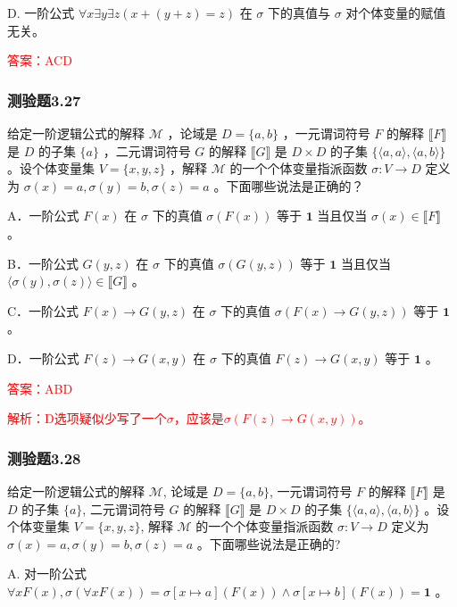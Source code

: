 \documentclass[UTF8, heading=true]{ctexart}
\begin{document}
D. 一阶公式 $\forall x \exists y \exists z(x+(y+z)=z)$ 在 $\sigma$ 下的真值与 $\sigma$ 对个体变量的赋值无关。

\textcolor{red}{答案：ACD}

\subsubsection{测验题3.27}

给定一阶逻辑公式的解释 $\mathcal{M}$ ，论域是 $D=\{a, b\}$ ，一元谓词符号 $F$ 的解释 $\llbracket F\rrbracket$ 是 $D$ 的子集 $\{a\}$ ，二元谓词符号 $G$ 的解释 $\llbracket G \rrbracket$ 是 $D \times D$ 的子集 $\{\langle a, a\rangle,\langle a, b\rangle\}$ 。设个体变量集 $V=\{x, y, z\}$ ，解释 $\mathcal{M}$ 的一个个体变量指派函数 $\sigma: V \rightarrow D$ 定义为 $\sigma(x)=a, \sigma(y)=b, \sigma(z)=a$ 。下面哪些说法是正确的？

A．一阶公式 $F(x)$ 在 $\sigma$ 下的真值 $\sigma(F(x))$ 等于 $\mathbf{1}$ 当且仅当 $\sigma(x) \in \llbracket F \rrbracket$ 。

B．一阶公式 $G(y, z)$ 在 $\sigma$ 下的真值 $\sigma(G(y, z))$ 等于 $\mathbf{1}$ 当且仅当 $\langle\sigma(y), \sigma(z)\rangle \in \llbracket G \rrbracket$ 。

C．一阶公式 $F(x) \rightarrow G(y, z)$ 在 $\sigma$ 下的真值 $\sigma(F(x) \rightarrow G(y, z))$ 等于 $\mathbf{1}$ 。

D．一阶公式 $F(z) \rightarrow G(x, y)$ 在 $\sigma$ 下的真值 $F(z) \rightarrow G(x, y)$ 等于 $\mathbf{1}$ 。


\textcolor{red}{答案：ABD}

\textcolor{red}{解析：D选项疑似少写了一个$\sigma$，应该是$\sigma(F(z) \rightarrow G(x, y))$。}

\subsubsection{测验题3.28}

给定一阶逻辑公式的解释 $\mathcal{M}$, 
论域是 $D=\{a, b\}$, 一元谓词符号 $F$ 的解释 $\llbracket F \rrbracket$ 
是 $D$ 的子集 $\{a\}$, 二元谓词符号 $G$ 的解释 $\llbracket G \rrbracket$ 是 $D \times D$ 的子集 $\{\langle a, a\rangle,\langle a, b\rangle\}$ 。设个体变量集 $V=\{x, y, z\}$, 解释 $\mathcal{M}$ 的一个个体变量指派函数 $\sigma: V \rightarrow D$ 定义为 $\sigma(x)=a, \sigma(y)=b, \sigma(z)=a$ 。下面哪些说法是正确的?

A. 对一阶公式 $\forall x F(x), \sigma(\forall x F(x))=\sigma[x \mapsto a](F(x)) \wedge \sigma[x \mapsto b](F(x))=\mathbf{1}$ 。
\end{document}
